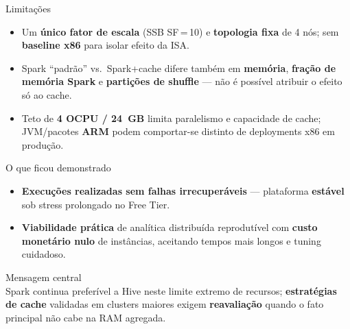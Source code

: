 
\begin{frame}{Limita\c{c}\~oes}
  \begin{itemize}
    \item Um \textbf{\'unico fator de escala} (SSB SF\,=\,10) e \textbf{topologia fixa} de 4 n\'os; sem \textbf{baseline x86} para isolar efeito da ISA.
    \item Spark ``padr\~ao'' vs.\ Spark+cache difere tamb\'em em \textbf{mem\'oria}, \textbf{fra\c{c}\~ao de mem\'oria Spark} e \textbf{parti\c{c}\~oes de shuffle} --- n\~ao \'e poss\'ivel atribuir o efeito s\'o ao cache.
    \item Teto de \textbf{4 OCPU / 24~GB} limita paralelismo e capacidade de cache; JVM/pacotes \textbf{ARM} podem comportar-se distinto de deployments x86 em produ\c{c}\~ao.
  \end{itemize}
\end{frame}

\begin{frame}{O que ficou demonstrado}
  \begin{itemize}
    \item \textbf{Execuções realizadas sem falhas irrecuper\'aveis }--- plataforma \textbf{est\'avel} sob stress prolongado no Free Tier.
    \item \textbf{Viabilidade pr\'atica} de anal\'itica distribu\'ida reprodut\'ivel com \textbf{custo monet\'ario nulo} de inst\^ancias, aceitando tempos mais longos e tuning cuidadoso.
  \end{itemize}
  \vspace{0.5em}
  \begin{cefetblock}{Mensagem central} \\
    Spark continua prefer\'ivel a Hive neste limite extremo de recursos; \textbf{estrat\'egias de cache} validadas em clusters maiores exigem \textbf{reavalia\c{c}\~ao} quando o fato principal n\~ao cabe na RAM agregada.
  \end{cefetblock}
\end{frame}
